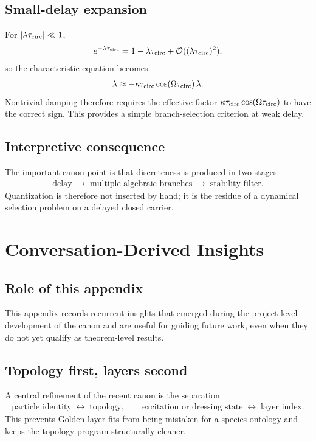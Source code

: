 \documentclass[11pt]{article}
\theoremstyle{definition}
\theoremstyle{plain}
\theoremstyle{remark}
\begin{document}
        \subsection{Small-delay expansion}
            For $|\lambda\tau_{\rm circ}|\ll 1$,
            \begin{align}
                e^{-\lambda\tau_{\rm circ}} = 1 - \lambda\tau_{\rm circ} + \mathcal{O}((\lambda\tau_{\rm circ})^2),
            \end{align}
            so the characteristic equation becomes
            \begin{align}
                \lambda \approx -\kappa\tau_{\rm circ}\cos(\Omega\tau_{\rm circ})\,\lambda.
            \end{align}
            Nontrivial damping therefore requires the effective factor $\kappa\tau_{\rm circ}\cos(\Omega\tau_{\rm circ})$ to have the correct sign. This provides a simple branch-selection criterion at weak delay.

        \subsection{Interpretive consequence}
            The important canon point is that discreteness is produced in two stages:
            \begin{align}
                \text{delay} \;\longrightarrow\; \text{multiple algebraic branches} \;\longrightarrow\; \text{stability filter}.
            \end{align}
            Quantization is therefore not inserted by hand; it is the residue of a dynamical selection problem on a delayed closed carrier.

    \section{Conversation-Derived Insights}
        \label{sec:appendix_conversations}

        \subsection{Role of this appendix}
            This appendix records recurrent insights that emerged during the project-level development of the canon and are useful for guiding future work, even when they do not yet qualify as theorem-level results.

        \subsection{Topology first, layers second}
            A central refinement of the recent canon is the separation
            \begin{align}
                \text{particle identity} \;\longleftrightarrow\; \text{topology},
                \qquad
                \text{excitation or dressing state} \;\longleftrightarrow\; \text{layer index}.
            \end{align}
            This prevents Golden-layer fits from being mistaken for a species ontology and keeps the topology program structurally cleaner.
\end{document}
